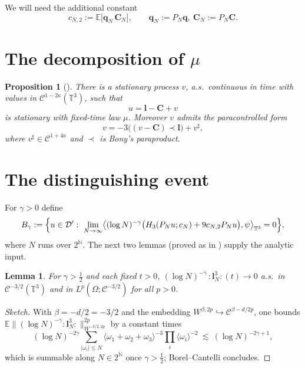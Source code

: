 \documentclass[11pt]{article}
\newcommand{\T}{\mathbb{T}}
\newcommand{\N}{\mathbb{N}}
\newcommand{\C}{\mathcal{C}}
\newcommand{\D}{\mathcal{D}}
\newcommand{\E}{\mathbb{E}}
\newcommand{\Hp}{H}      %
\newcommand{\PN}{P_N}
\newcommand{\Lin}{\mathbf{l}}   %
\newcommand{\Lsq}{\mathbf{q}}   %
\newcommand{\Iqc}{\mathbf{C}}   %
\newtheorem{lemma}{Lemma}
\newtheorem{proposition}{Proposition}
\begin{document}
We will need the additional constant
\begin{equation}\label{eq:cN2}
c_{N,2}:=\E\bigl[\Lsq_N\,\Iqc_N\bigr],\qquad \Lsq_N:=\PN\Lsq,\ \Iqc_N:=\PN\Iqc.
\end{equation}

\section*{The decomposition of $\mu$}

\begin{proposition}[\cite{HM18,EW24,CC18}]\label{prop:decomp}
There is a stationary process $v$, a.s.\ continuous in time with values in
$\C^{1-2\kappa}(\T^3)$, such that
\begin{equation}\label{eq:u}
u=\Lin-\Iqc+v
\end{equation}
is stationary with fixed-time law $\mu$. Moreover $v$ admits the paracontrolled
form
\begin{equation}\label{eq:v}
v=-3\bigl((v-\Iqc)\prec\Lin\bigr)+v^\sharp,
\end{equation}
where $v^\sharp\in\C^{1+4\kappa}$ and $\prec$ is Bony's paraproduct.
\end{proposition}

\section*{The distinguishing event}

For $\gamma>0$ define
\[
B_\gamma:=\Bigl\{u\in\D':\ \lim_{N\to\infty}\bigl\langle(\log N)^{-\gamma}\bigl(\Hp_3(\PN u;c_N)+9c_{N,2}\PN u\bigr),\psi\bigr\rangle_{\T^3}=0\Bigr\},
\]
where $N$ runs over $2^{\N}$. The next two lemmas (proved as in
\cite[Lems.~3.11--3.12]{HKN24}) supply the analytic input.

\begin{lemma}\label{lem:cube}
For $\gamma>\tfrac12$ and each fixed $t>0$,
$(\log N)^{-\gamma}\,{:}\Lin_N^3{:}(t)\to0$ a.s.\ in $\C^{-3/2}(\T^3)$ and in
$L^p(\Omega;\C^{-3/2})$ for all $p>0$.
\end{lemma}

\begin{proof}[Sketch]
With $\beta=-d/2=-3/2$ and the embedding $W^{\beta,2p}\hookrightarrow
\C^{\beta-d/2p}$, one bounds
$\E\|(\log N)^{-\gamma}{:}\Lin_N^3{:}\|_{W^{-3/2,2p}}^{2p}$ by a constant times
\[
(\log N)^{-2\gamma}\sum_{|\omega_i|\le N}\langle\omega_1+\omega_2+\omega_3\rangle^{-3}\prod_{i}\langle\omega_i\rangle^{-2}
\ \lesssim\ (\log N)^{-2\gamma+1},
\]
which is summable along $N\in2^\N$ once $\gamma>\tfrac12$; Borel--Cantelli
concludes.
\end{proof}
\end{document}
